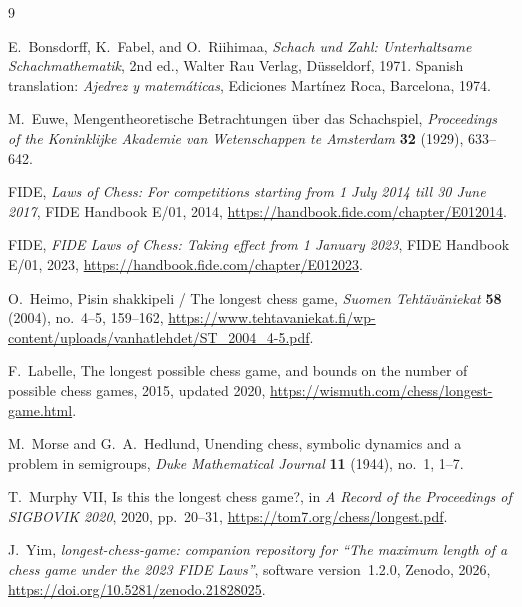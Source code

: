 \documentclass[11pt]{article}
\theoremstyle{definition}
\begin{document}
\begin{thebibliography}{9}

E.~Bonsdorff, K.~Fabel, and O.~Riihimaa,
\emph{Schach und Zahl: Unterhaltsame Schachmathematik},
2nd ed., Walter Rau Verlag, D\"usseldorf, 1971.
Spanish translation: \emph{Ajedrez y matem\'aticas},
Ediciones Mart\'inez Roca, Barcelona, 1974.

M.~Euwe,
Mengentheoretische Betrachtungen \"uber das Schachspiel,
\emph{Proceedings of the Koninklijke Akademie van Wetenschappen te Amsterdam}
\textbf{32} (1929), 633--642.

FIDE,
\emph{Laws of Chess: For competitions starting from 1 July 2014 till
30 June 2017},
FIDE Handbook E/01, 2014,
\url{https://handbook.fide.com/chapter/E012014}.

FIDE,
\emph{FIDE Laws of Chess: Taking effect from 1 January 2023},
FIDE Handbook E/01, 2023,
\url{https://handbook.fide.com/chapter/E012023}.

O.~Heimo,
Pisin shakkipeli / The longest chess game,
\emph{Suomen Teht\"av\"aniekat} \textbf{58} (2004), no.~4--5, 159--162,
\url{https://www.tehtavaniekat.fi/wp-content/uploads/vanhatlehdet/ST_2004_4-5.pdf}.

F.~Labelle,
The longest possible chess game, and bounds on the number of possible chess
games, 2015, updated 2020,
\url{https://wismuth.com/chess/longest-game.html}.

M.~Morse and G.~A.~Hedlund,
Unending chess, symbolic dynamics and a problem in semigroups,
\emph{Duke Mathematical Journal} \textbf{11} (1944), no.~1, 1--7.

T.~Murphy VII,
Is this the longest chess game?,
in \emph{A Record of the Proceedings of SIGBOVIK 2020}, 2020, pp.~20--31,
\url{https://tom7.org/chess/longest.pdf}.

J.~Yim,
\emph{longest-chess-game: companion repository for ``The maximum length of a
chess game under the 2023 FIDE Laws''},
software version~1.2.0, Zenodo, 2026,
\url{https://doi.org/10.5281/zenodo.21828025}.

\end{thebibliography}
\end{document}
